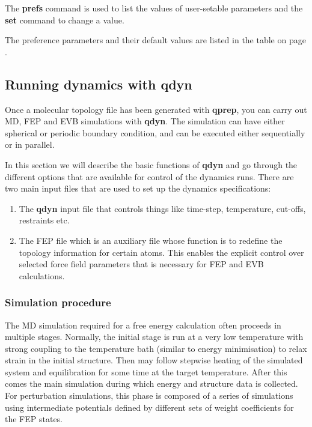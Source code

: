 \documentclass[a4paper,10pt]{article}
\begin{document}
The \textbf{prefs} command is used to list the values of
user-setable parameters and the \textbf{set} command to change a
value.

The preference parameters and their default values are listed in
the table on page \pageref{subsubsec:Qprep_preferences}.

\subsection{Running dynamics with \textbf{qdyn}}
Once a molecular topology file has been generated with \textbf{qprep}, you
can carry out MD, FEP and EVB simulations with \textbf{qdyn}. The
simulation can have either spherical or periodic boundary
condition, and can be executed either sequentially or in parallel.

In this section we will describe the basic functions of \textbf{qdyn} and
go through the different options that are available for control of
the dynamics runs. There are two main input files that are used to
set up the dynamics specifications:

\begin{enumerate}
\item The \textbf{qdyn} input file that controls things like time-step, temperature,
cut-offs, restraints etc. \item The FEP file which is an auxiliary
file whose function is to redefine the topology information for
certain atoms. This enables the explicit control over selected
force field parameters that is necessary for FEP and EVB
calculations.
\end{enumerate}

\subsubsection{Simulation procedure}
The MD simulation required for a free energy calculation often
proceeds in multiple stages. Normally, the initial stage is run at
a very low temperature with strong coupling to the temperature
bath (similar to energy minimisation) to relax strain in the
initial structure. Then may follow stepwise heating of the
simulated system and equilibration for some time at the target
temperature. After this comes the main simulation during which
energy and structure data is collected. For perturbation
simulations, this phase is composed of a series of simulations
using intermediate potentials defined by different sets of weight
coefficients for the FEP states.
\end{document}

